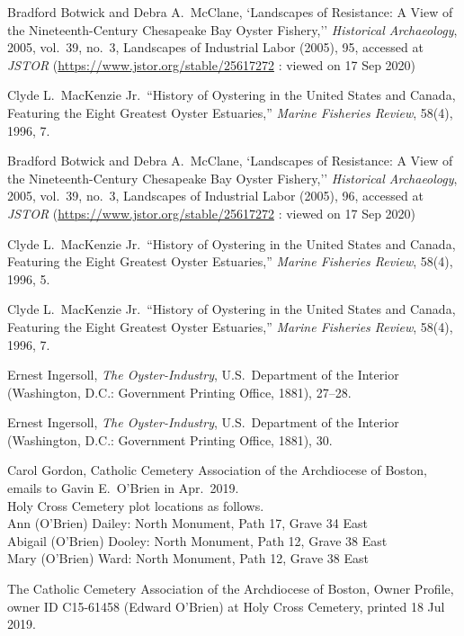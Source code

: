 \begin{thebibliography}{999}
Bradford Botwick and Debra A.\ McClane, `Landscapes of Resistance: A View of the Nineteenth-Century Chesapeake Bay Oyster Fishery,''  \textit{Historical Archaeology}, 2005, vol.\ 39, no.\ 3, Landscapes of Industrial Labor (2005), 95, accessed at \textit{JSTOR} (\url{https://www.jstor.org/stable/25617272} : viewed on 17 Sep 2020)

Clyde L.\ MacKenzie Jr.\, ``History of Oystering in the United States and Canada, Featuring the Eight Greatest Oyster Estuaries,'' \textit{Marine Fisheries Review}, 58(4), 1996, 7.

Bradford Botwick and Debra A.\ McClane, `Landscapes of Resistance: A View of the Nineteenth-Century Chesapeake Bay Oyster Fishery,''  \textit{Historical Archaeology}, 2005, vol.\ 39, no.\ 3, Landscapes of Industrial Labor (2005), 96, accessed at \textit{JSTOR} (\url{https://www.jstor.org/stable/25617272} : viewed on 17 Sep 2020)

Clyde L.\ MacKenzie Jr.\, ``History of Oystering in the United States and Canada, Featuring the Eight Greatest Oyster Estuaries,'' \textit{Marine Fisheries Review}, 58(4), 1996, 5. 

Clyde L.\ MacKenzie Jr.\, ``History of Oystering in the United States and Canada, Featuring the Eight Greatest Oyster Estuaries,'' \textit{Marine Fisheries Review}, 58(4), 1996, 7.

Ernest Ingersoll, \textit{The Oyster-Industry}, U.S.\ Department of the Interior (Washington, D.C.: Government Printing Office, 1881), 27--28.

Ernest Ingersoll, \textit{The Oyster-Industry}, U.S.\ Department of the Interior (Washington, D.C.: Government Printing Office, 1881), 30.

Carol Gordon, Catholic Cemetery Association of the Archdiocese of Boston, emails to Gavin E.\ O'Brien in Apr.\ 2019.\\
Holy Cross Cemetery plot locations as follows.\\
Ann (O’Brien) Dailey: North Monument, Path 17, Grave 34 East\\
Abigail (O’Brien) Dooley: North Monument, Path 12, Grave 38 East\\
Mary (O’Brien) Ward: North Monument, Path 12, Grave 38 East

The Catholic Cemetery Association of the Archdiocese of Boston, Owner Profile, owner ID C15-61458 (Edward O'Brien) at Holy Cross Cemetery, printed 18 Jul 2019.


\end{thebibliography}
